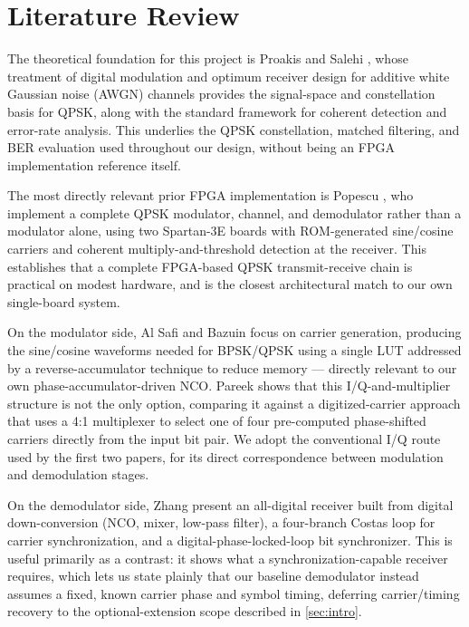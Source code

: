 \documentclass[10pt,twocolumn,letterpaper]{article}
\begin{document}
\section{Literature Review}
\label{sec:litreview}

The theoretical foundation for this project is Proakis and Salehi
\cite{proakis2002communication}, whose treatment of digital modulation and
optimum receiver design for additive white Gaussian noise (AWGN)
channels provides the signal-space and constellation basis for QPSK,
along with the standard framework for coherent detection and
error-rate analysis. This underlies the QPSK constellation, matched
filtering, and BER evaluation used throughout our design, without
being an FPGA implementation reference itself.

The most directly relevant prior FPGA implementation is Popescu \etal
\cite{6034354}, who implement a complete QPSK modulator,
channel, and demodulator rather than a modulator alone, using two
Spartan-3E boards with ROM-generated sine/cosine carriers and
coherent multiply-and-threshold detection at the receiver. This
establishes that a complete FPGA-based QPSK transmit-receive chain is
practical on modest hardware, and is the closest architectural match
to our own single-board system.

On the modulator side, Al Safi and Bazuin \cite{7777861}
focus on carrier generation, producing the sine/cosine waveforms
needed for BPSK/QPSK using a single LUT addressed by a
reverse-accumulator technique to reduce memory --- directly relevant
to our own phase-accumulator-driven NCO. Pareek \cite{7509346}
shows that this I/Q-and-multiplier structure is not the only option,
comparing it against a digitized-carrier approach that uses a 4:1
multiplexer to select one of four pre-computed phase-shifted carriers
directly from the input bit pair. We adopt the conventional I/Q route
used by the first two papers, for its direct correspondence between
modulation and demodulation stages.

On the demodulator side, Zhang \etal \cite{inproceedings} present an
all-digital receiver built from digital down-conversion (NCO, mixer,
low-pass filter), a four-branch Costas loop for carrier
synchronization, and a digital-phase-locked-loop bit synchronizer.
This is useful primarily as a contrast: it shows what a
synchronization-capable receiver requires, which lets us state plainly
that our baseline demodulator instead assumes a fixed, known carrier
phase and symbol timing, deferring carrier/timing recovery to the
optional-extension scope described in \cref{sec:intro}.
\end{document}
